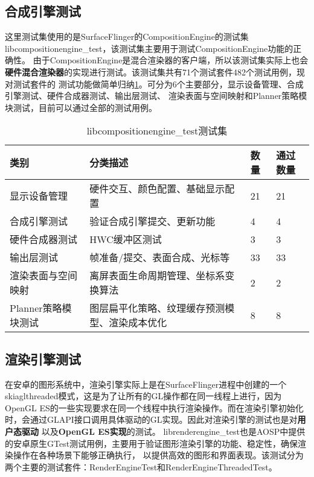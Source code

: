 \subsection{合成引擎测试}
\label{sec:合成引擎正确性测试}

这里测试集使用的是SurfaceFlinger的CompositionEngine的测试集libcompositionengine\_test，该测试集主要用于测试CompositionEngine功能的正确性。
由于CompositionEngine是混合渲染器的客户端，所以该测试集实际上也会\textbf{硬件混合渲染器}的实现进行测试。该测试集共有71个测试套件482个测试用例，现对测试套件的
测试功能做简单归纳\ref{tab:libcompositionengine_test测试集}。可分为6个主要部分，显示设备管理、合成引擎测试、硬件合成器测试、输出层测试、
渲染表面与空间映射和Planner策略模块测试，目前可以通过全部的测试用例。

\begin{table}[H]
    \centering
    \caption{libcompositionengine\_test测试集}
    \label{tab:libcompositionengine_test测试集}
    \begin{tabular}{llll}
      \toprule
      类别 &  分类描述 & 数量 & 通过数量\\
      \midrule
      显示设备管理 & 硬件交互、颜色配置、基础显示配置 & 21 & 21\\
      合成引擎测试 & 验证合成引擎提交、更新功能 & 4 & 4\\
      硬件合成器测试 & HWC缓冲区测试 & 3 & 3\\
      输出层测试 & 帧准备/提交、表面合成、光标等  & 33 & 33\\
      渲染表面与空间映射 & 	离屏表面生命周期管理、坐标系变换算法 & 2 & 2\\
      Planner策略模块测试 & 图层扁平化策略、纹理缓存预测模型、渲染成本优化 & 8 & 8\\
      \bottomrule
    \end{tabular}
    \note{}
\end{table}


\subsection{渲染引擎测试}
\label{sec:渲染引擎正确性测试}

在安卓的图形系统中，渲染引擎实际上是在SurfaceFlinger进程中创建的一个skiaglthreaded模式，这是为了让所有的GL操作都在同一线程上进行，因为
OpenGL ES的一些实现要求在同一个线程中执行渲染操作。而在渲染引擎初始化时，会通过GLAPI接口调用具体驱动的GL实现。因此对渲染引擎的测试也是对\textbf{用户态驱动}
以及\textbf{OpenGL ES实现}的测试。
librenderengine\_test也是AOSP中提供的安卓原生GTest测试用例，主要用于验证图形渲染引擎的功能、稳定性，确保渲染操作在各种场景下能够正确执行，
以提供高效的图形和界面表现。该测试分为两个主要的测试套件：RenderEngineTest和RenderEngineThreadedTest。

